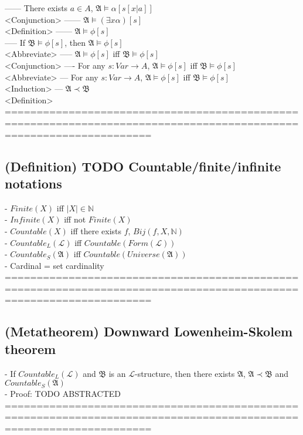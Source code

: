 \documentclass{book}
\begin{document}
						------ There exists $a \in A$, $\mathfrak{A} \vDash \alpha[s[x|a]]$ \\ <Conjunction>
						------ $\mathfrak{A} \vDash (\exists x \alpha)[s]$ \\ <Definition>
						------ $\mathfrak{A} \vDash \phi[s]$ \\
					----- If $\mathfrak{B} \vDash \phi[s]$, then $\mathfrak{A} \vDash \phi[s]$ \\ <Abbreviate>
					----- $\mathfrak{A} \vDash \phi[s]$ iff $\mathfrak{B} \vDash \phi[s]$ \\ <Conjunction>
				---- For any $s: Var \rightarrow A$, $\mathfrak{A} \vDash \phi[s]$ iff $\mathfrak{B} \vDash \phi[s]$ \\ <Abbreviate>
			--- For any $s: Var \rightarrow A$, $\mathfrak{A} \vDash \phi[s]$ iff $\mathfrak{B} \vDash \phi[s]$ \\ <Induction>
			--- $\mathfrak{A} \prec \mathfrak{B}$ \\ <Definition>
	===================================================================================================================
\subsection{(Definition) TODO Countable/finite/infinite notations}
	- $Finite(X)$ iff $|X| \in \mathbb{N}$ \\
	- $Infinite(X)$ iff not $Finite(X)$ \\
	- $Countable(X)$ iff there exists $f$, $Bij(f, X, \mathbb{N})$ \\
	- $Countable_L(\mathcal{L})$ iff $Countable(Form(\mathcal{L}))$ \\
	- $Countable_S(\mathfrak{A})$ iff $Countable(Universe(\mathfrak{A}))$ \\
	- Cardinal = set cardinality \\
	===================================================================================================================
\subsection{(Metatheorem) Downward Lowenheim-Skolem theorem} %
	- If $Countable_L(\mathcal{L})$ and $\mathfrak{B}$ is an $\mathcal{L}$-structure, then there exists $\mathfrak{A}$, $\mathfrak{A} \prec \mathfrak{B}$ and $Countable_S(\mathfrak{A})$ \\
	- Proof: TODO ABSTRACTED \\
	===================================================================================================================
\end{document}
